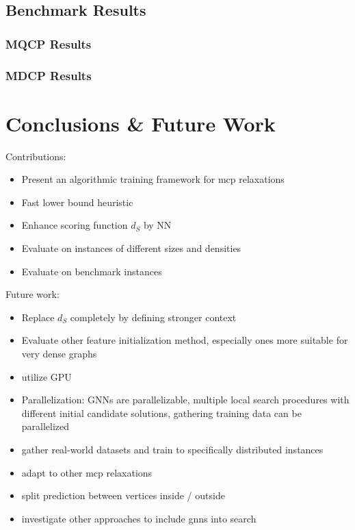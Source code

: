 \documentclass[draft,final]{vutinfth} %
\begin{document}
\section{Benchmark Results}

\subsection{MQCP Results}
\subsection{MDCP Results}





\chapter{Conclusions \& Future Work}\label{chp:conclusions}

Contributions:
\begin{itemize}
    \item Present an algorithmic training framework for mcp relaxations
    \item Fast lower bound heuristic
    \item Enhance scoring function $d_S$ by NN 
    \item Evaluate on instances of different sizes and densities
    \item Evaluate on benchmark instances
\end{itemize}

Future work:
\begin{itemize}
    \item Replace $d_S$ completely by defining stronger context
    \item Evaluate other feature initialization method, especially ones more suitable for very dense graphs
    \item utilize GPU
    \item Parallelization: GNNs are parallelizable, multiple local search procedures with different initial candidate solutions, gathering training data can be parallelized
    \item gather real-world datasets and train to specifically distributed instances
    \item adapt to other mcp relaxations 
    \item split prediction between vertices inside / outside 
    \item investigate other approaches to include gnns into search 
\end{itemize}
\end{document}
